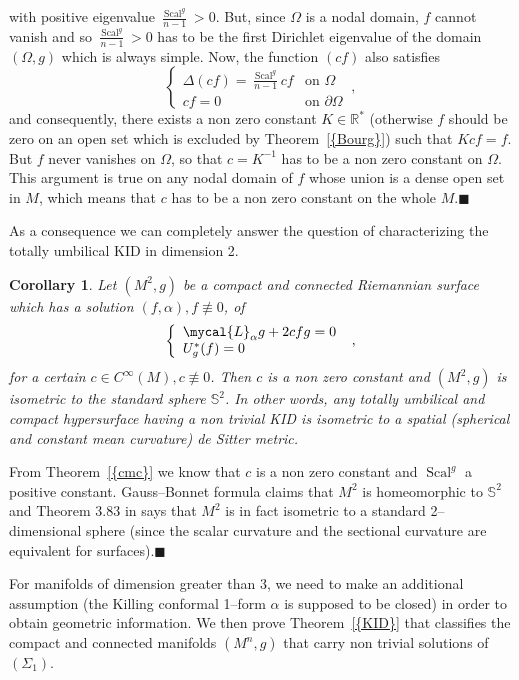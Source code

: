 \documentclass[a4paper,11pt,leqno]{amsart}
\numberwithin{equation}{section}
\theoremstyle{main}
\newtheorem{coro} [thm] {\bf  Corollary}
\begin{document}
with positive eigenvalue $\frac{{\operatorname{Scal}}^g}{n-1}>0$. But, since $\Omega$ is a nodal domain, $f$ cannot vanish and so $\frac{{\operatorname{Scal}}^g}{n-1}>0$ has to be the first Dirichlet eigenvalue of the domain $(\Omega,g)$ which is always simple. Now, the function $(cf)$ also satisfies
$$\left\{
\begin{array}{cl}
	\Delta (cf)=\frac{{\operatorname{Scal}}^g}{n-1}cf& \textrm{on } \Omega  \\
	cf=0 & \textrm{on } \partial\Omega
\end{array}\right. \ ,$$
and consequently, there exists a non zero constant $K\in{{\mathbb R}}^*$ (otherwise $f$ should be zero on an open set which is excluded by Theorem~{\ref{{Bourg}}}) such that $Kcf=f$. But $f$ never vanishes on $\Omega$, so that $c=K^{-1}$ has to be a non zero constant on $\Omega$. This  argument is true on any nodal domain of $f$ whose union is a dense open set in $M$, which means that $c$ has to be a non zero constant on the whole $M$.{\hfill $\blacksquare$ \medskip \\}

As a consequence we can completely answer the question of characterizing the totally umbilical KID in dimension 2.
\begin{coro}
	Let  $(M^2, g)$ be a compact and connected Riemannian surface which has a solution $(f,\alpha), f\not\equiv 0$, of
$$ \left\{
\begin{array}{l}
	 \mycal{L}_\alpha g+ 2cfg= 0 \\
	 U_g^* (f)=0
\end{array}\right. \ ,$$
for a certain $c\in C^{\infty}(M), c\not\equiv 0$. Then $c$ is a non zero constant and $(M^2,g)$ is isometric to the standard sphere $\mathbb S^2$. In other words, any totally umbilical and compact hypersurface having a non trivial KID is isometric to a spatial (spherical and constant mean curvature) de Sitter metric.
\end{coro}
\proof From Theorem~{\ref{{cmc}}} we know that $c$ is a non zero constant and ${\operatorname{Scal}}^g$ a positive constant. Gauss--Bonnet formula claims that $M^2$ is homeomorphic to $\mathbb S^2$ and Theorem 3.83 in \cite{GHL} says that $M^2$ is in fact isometric to a standard 2--dimensional sphere (since the scalar curvature and the sectional curvature are equivalent for surfaces).{\hfill $\blacksquare$ \medskip \\}

For manifolds of dimension greater than 3, we need to make an additional assumption (the Killing conformal 1--form $\alpha$ is supposed to be closed) in order to obtain geometric information. We then prove Theorem~{\ref{{KID}}} that classifies the compact and connected manifolds $(M^n, g)$ that carry non trivial solutions of $(\Sigma_1)$.
\end{document}
